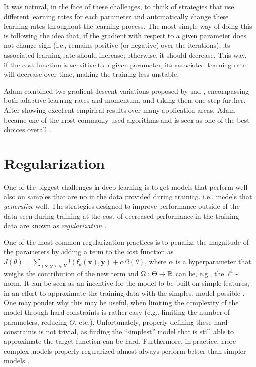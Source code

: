 It was natural, in the face of these challenges, to think of strategies that use different learning rates for each parameter and automatically change these learning rates throughout the learning process.
The most simple way of doing this is following the idea that, if the gradient with respect to a given parameter does not change sign (i.e., remains positive (or negative) over the iterations), its associated learning rate should increase; otherwise, it should decrease.
This way, if the cost function is sensitive to a given parameter, its associated learning rate will decrease over time, making the training less unstable.

Adam\cite{kingma_adam_2015} combined two gradient descent variations proposed by \textcite{duchi_adaptive_2011} and \textcite{tieleman_lecture_2012}, encompassing both adaptive learning rates and momentum, and taking them one step further.
After showing excellent empirical results over many application areas, Adam became one of the most commonly used algorithms and is seen as one of the best choices overall \cite{ruder_overview_2017}.

\section{Regularization}

One of the biggest challenges in deep learning is to get models that perform well also on samples that are no in the data provided during training, i.e., models that \emph{generalize} well.
The strategies designed to improve performance outside of the data seen during training at the cost of decreased performance in the training data are known as \emph{regularization} \cite{goodfellow_deep_2016}.

One of the most common regularization practices is to penalize the magnitude of the parameters by adding a term to the cost function as $J\left( \theta \right) = \sum_{(\bm{x},\bm{y})\in X} l(\bm{f}_\theta(\bm{x}), \bm{y}) + \alpha\Omega\left( \theta \right) $, where $\alpha$ is a hyperparameter that weighs the contribution of the new term and $\Omega:\Theta\to\mathbb{R}$ can be, e.g., the $\ell^1$-norm.
It can be seen as an incentive for the model to be built on simple features, in an effort to approximate the training data with the simplest model possible \cite{goodfellow_deep_2016}.
One may ponder why this may be useful, when limiting the complexity of the model through hard constraints is rather easy (e.g., limiting the number of parameters, reducing $\Theta$, etc.).
Unfortunately, properly defining these hard constraints is not trivial, as finding the ``simplest'' model that is still able to approximate the target function can be hard.
Furthermore, in practice, more complex models properly regularized almost always perform better than simpler models \cite{goodfellow_deep_2016}.

